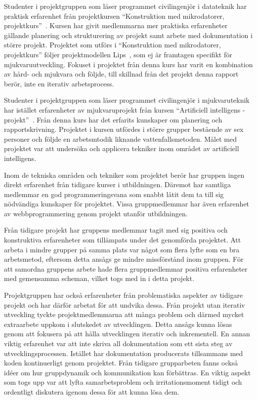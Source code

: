 Studenter i projektgruppen som läser programmet civilingenjör i datateknik har praktisk erfarenhet från projektkursen ``Konstruktion med mikrodatorer, projektkurs''~\cite{tsea29}. Kursen har givit medlemmarna mer praktiska erfarenheter gällande planering och strukturering av projekt samt arbete med dokumentation i större projekt. Projektet som utförs i ``Konstruktion med mikrodatorer, projektkurs'' följer projektmodellen Lips~\cite{lips}, som ej är framtagen specifikt för mjukvaruutveckling. Fokuset i projektet från denna kurs har varit en kombination av hård- och mjukvara och följde, till skillnad från det projekt denna rapport berör, inte en iterativ arbetsprocess.

Studenter i projektgruppen som läser programmet civilingenjör i mjukvaruteknik har istället erfarenheter av mjukvaruprojekt från kursen ``Artificiell intelligens - projekt''~\cite{tddd92}. Från denna kurs har det erfarits kunskaper om planering och rapportskrivning. Projektet i kursen utfördes i större grupper bestående av sex personer och följde en arbetsmtodik liknande vattenfallsmetoden. Målet med projektet var att undersöka och applicera tekniker inom området av artificiell intelligens.

Inom de tekniska områden och tekniker som projektet berör har gruppen ingen direkt erfarenhet från tidigare kurser i utbildningen. Däremot har samtliga medlemmar en god programmeringsvana som snabbt låtit dem ta till sig nödvändiga kunskaper för projektet. Vissa gruppmedlemmar har även erfarenhet av webbprogrammering genom projekt utanför utbildningen.

Från tidigare projekt har gruppens medlemmar tagit med sig positiva och konstruktiva erfarenheter som tillämpats under det genomförda projektet. Att arbeta i mindre grupper på samma plats var något som flera lyfte som en bra arbetsmetod, eftersom detta ansågs ge mindre missförstånd inom gruppen. För att samordna gruppens arbete hade flera gruppmedlemmar positiva erfarenheter med gemensamma scheman, vilket togs med in i detta projekt.

Projektgruppen har också erfarenheter från problematiska aspekter av tidigare projekt och har därför arbetat för att undvika dessa. Från projekt utan iterativ utveckling tyckte projektmedlemmarna att många problem och därmed mycket extraarbete uppkom i slutskedet av utvecklingen. Detta ansågs kunna lösas genom att fokusera på att hålla utvecklingen iterativ och inkrementell. En annan viktig erfarenhet var att inte skriva all dokumentation som ett sista steg av utvecklingsprocessen. Istället har dokumentation producerats tillsammans med koden kontinuerligt genom projektet. Från tidigare grupparbeten fanns också idéer om hur gruppdynamik och kommunikation kan förbättras. En viktig aspekt som togs upp var att lyfta samarbetsproblem och irritationsmoment tidigt och ordentligt diskutera igenom dessa för att kunna lösa dem.
